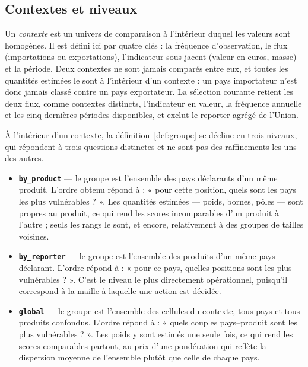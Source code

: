 \documentclass[11pt,a4paper]{article}
\theoremstyle{definition}
\theoremstyle{remark}
\begin{document}
\bigskip

\subsection{Contextes et niveaux}
\label{sec:app-niveaux}

\medskip

Un \emph{contexte} est un univers de comparaison à l'intérieur duquel les valeurs sont
homogènes. Il est défini ici par quatre clés : la fréquence d'observation, le flux
(importations ou exportations), l'indicateur sous-jacent (valeur en euros, masse) et la
période. Deux contextes ne sont jamais comparés entre eux, et toutes les quantités estimées
le sont à l'intérieur d'un contexte : un pays importateur n'est donc jamais classé contre
un pays exportateur. La sélection courante retient les deux flux, comme contextes
distincts, l'indicateur en valeur, la fréquence annuelle et les cinq dernières périodes
disponibles, et exclut le reporter agrégé de l'Union.

\medskip

À l'intérieur d'un contexte, la définition~\ref{def:groupe} se décline en trois niveaux,
qui répondent à trois questions distinctes et ne sont pas des raffinements les uns des
autres.

\medskip

\begin{itemize}[leftmargin=1.4em,itemsep=3pt]
  \item \textbf{\texttt{by\_product}} --- le groupe est l'ensemble des pays déclarants d'un
  même produit. L'ordre obtenu répond à : « pour cette position, quels sont les pays les
  plus vulnérables ? ». Les quantités estimées --- poids, bornes, pôles --- sont propres au
  produit, ce qui rend les scores incomparables d'un produit à l'autre ; seuls les rangs le
  sont, et encore, relativement à des groupes de tailles voisines.
  \item \textbf{\texttt{by\_reporter}} --- le groupe est l'ensemble des produits d'un même
  pays déclarant. L'ordre répond à : « pour ce pays, quelles positions sont les plus
  vulnérables ? ». C'est le niveau le plus directement opérationnel, puisqu'il correspond à
  la maille à laquelle une action est décidée.
  \item \textbf{\texttt{global}} --- le groupe est l'ensemble des cellules du contexte,
  tous pays et tous produits confondus. L'ordre répond à : « quels couples pays--produit
  sont les plus vulnérables ? ». Les poids y sont estimés une seule fois, ce qui rend les
  scores comparables partout, au prix d'une pondération qui reflète la dispersion moyenne
  de l'ensemble plutôt que celle de chaque pays.
\end{itemize}
\end{document}

